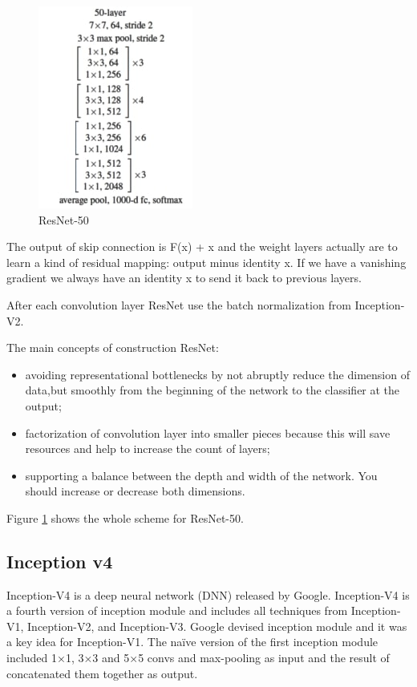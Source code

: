 \documentclass[titlepage]{report}
\begin{document}
\begin{figure}
\centering
\includegraphics[scale=0.85]{resnet_2}
\caption{ResNet-50}
\label{fig:resnet_50}
\end{figure}

The output of skip connection is  F(x) + x and the weight layers actually are to learn a kind of residual mapping: output minus identity x. If we have a vanishing gradient we always have an identity x to send it back to previous layers. 

After each convolution layer ResNet use the batch normalization from Inception-V2. 

The main concepts of construction ResNet:
\begin{itemize}
\item avoiding representational bottlenecks by not abruptly reduce the dimension of data,but smoothly from the beginning of the network to the classifier at the output;
\item factorization of convolution layer into smaller pieces because this will save resources and help to increase the count of layers;
\item supporting a balance between the depth and width of the network. You should increase or decrease both dimensions.
\end{itemize}

Figure \ref{fig:resnet_50} shows the whole scheme for ResNet-50.

\subsection{Inception v4}
Inception-V4 is a deep neural network (DNN) released by Google. Inception-V4 is a fourth version of inception module and includes all techniques from Inception-V1, Inception-V2, and Inception-V3. Google devised inception module and it was a key idea for Inception-V1. The naïve version of the first inception module included 1×1, 3×3 and 5×5 convs and max-pooling as input and the result of concatenated them together as output. \\
\end{document}
